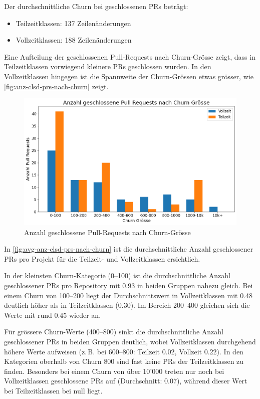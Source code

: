 Der durchschnittliche Churn bei geschlossenen PRs beträgt: \begin{itemize} \item Teilzeitklassen: 137 Zeilenänderungen \item Vollzeitklassen: 188 Zeilenänderungen \end{itemize}

Eine Aufteilung der geschlossenen Pull-Requests nach Churn-Grösse zeigt, dass in Teilzeitklassen vorwiegend kleinere PRs geschlossen wurden. In den Vollzeitklassen hingegen ist die Spannweite der Churn-Grössen etwas grösser, wie \autoref{fig:anz-clsd-prs-nach-churn} zeigt.

\begin{figure}[htbp]
    \includegraphics[width=\textwidth]{Figures/anzahl-geschlossene-prs-nach-churn.png}
    \caption{Anzahl geschlossene Pull-Requests nach Churn-Grösse}
    \label{fig:anz-clsd-prs-nach-churn}
\end{figure}

\newpage
In \autoref{fig:avg-anz-clsd-prs-nach-churn} ist die durchschnittliche Anzahl geschlossener PRs pro Projekt für die Teilzeit- und Vollzeitklassen ersichtlich.

In der kleinsten Churn-Kategorie (0--100) ist die durchschnittliche Anzahl geschlossener PRs pro Repository mit 0.93 in beiden Gruppen nahezu gleich. Bei einem Churn von 100--200 liegt der Durchschnittswert in Vollzeitklassen mit 0.48 deutlich höher als in Teilzeitklassen (0.30). Im Bereich 200--400 gleichen sich die Werte mit rund 0.45 wieder an.

Für grössere Churn-Werte (400--800) sinkt die durchschnittliche Anzahl geschlossener PRs in beiden Gruppen deutlich, wobei Vollzeitklassen durchgehend höhere Werte aufweisen (z.\,B. bei 600--800: Teilzeit 0.02, Vollzeit 0.22). In den Kategorien oberhalb von Churn 800 sind fast keine PRs der Teilzeitklassen zu finden. Besonders bei einem Churn von über 10'000 treten nur noch bei Vollzeitklassen geschlossene PRs auf (Durchschnitt: 0.07), während dieser Wert bei Teilzeitklassen bei null liegt.


